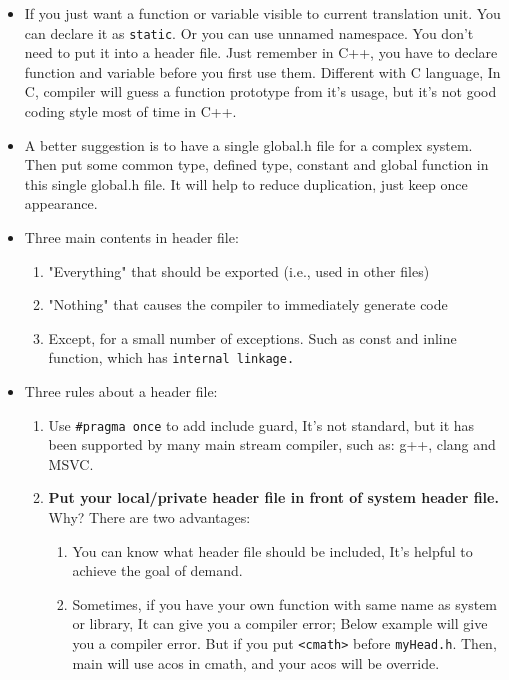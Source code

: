 \documentclass[a4paper,11pt,twoside]{book}
\begin{document}
\begin{itemize}
	\item If you just want a function or variable visible to current translation unit. You can declare it as \texttt{static}. Or you can use unnamed namespace.  You don't need to put it into a header file.  Just remember in C++, you have to declare function and variable before you first use them. Different with C language, In C, compiler will guess a function prototype from it's usage, but it's not good coding style most of time in C++.
	
	\item A better suggestion is to have a single global.h file for a complex system. Then put some common type, defined type, constant and global function in this single global.h file. It will help to reduce duplication, just keep once appearance.
	
	\item Three main contents in header file:
	\begin{enumerate}
		\item "Everything" that should be exported (i.e., used in other files)
		
		\item "Nothing" that causes the compiler to immediately generate code
		
		\item Except, for a small number of exceptions. Such as const and inline function, which has \texttt{internal linkage.}
	\end{enumerate}
	
	\item Three rules about a header file:
	
	\begin{enumerate}
		\item Use \texttt{\#pragma once} to add include guard, It's not standard, but it has been supported by many main stream compiler, such as: g++, clang and MSVC.
		
		\item \textbf{Put your local/private header file in front of system header file. }  Why? There are two advantages:
		\begin{enumerate}
			\item You can know what header file should be included, It's helpful to achieve the goal of demand.
			
			\item Sometimes, if you have your own function with same name as system or library, It can give you a compiler error; Below example will give you a compiler error. But if you put \texttt{<cmath>} before \texttt{myHead.h}. Then, main will use acos in cmath, and your acos will be override.
		\end{enumerate}
		

\end{enumerate}
\end{itemize}
\end{document}
